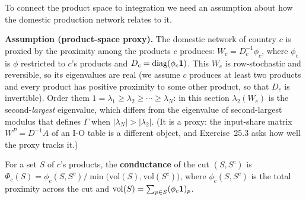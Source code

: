 \documentclass[../structural_economics_book.tex]{subfiles}
\begin{document}
To connect the product space to integration we need an assumption about how the domestic production network relates to it.

\textbf{Assumption (product-space proxy).} The domestic network of country $c$ is proxied by the proximity among the products $c$ produces: $W_c = D_c^{-1}\phi_c$, where $\phi_c$ is $\phi$ restricted to $c$'s products and $D_c = \operatorname{diag}(\phi_c\mathbf{1})$. This $W_c$ is row-stochastic and reversible, so its eigenvalues are real (we assume $c$ produces at least two products and every product has positive proximity to some other product, so that $D_c$ is invertible). Order them $1 = \lambda_1 \ge \lambda_2 \ge \cdots \ge \lambda_N$: in this section $\lambda_2(W_c)$ is the second-\emph{largest} eigenvalue, which differs from the eigenvalue of second-largest modulus that defines $\Gamma$ when $|\lambda_N| > |\lambda_2|$. (It is a proxy: the input-share matrix $W^P = D^{-1}A$ of an I-O table is a different object, and Exercise~25.3 asks how well the proxy tracks it.)

For a set $S$ of $c$'s products, the \textbf{conductance} of the cut $(S, S^c)$ is $\Phi_c(S) = \phi_c(S, S^c) / \min\bigl(\mathrm{vol}(S), \mathrm{vol}(S^c)\bigr)$, where $\phi_c(S,S^c)$ is the total proximity across the cut and $\mathrm{vol}(S) = \sum_{p \in S}(\phi_c\mathbf{1})_p$.
\end{document}
